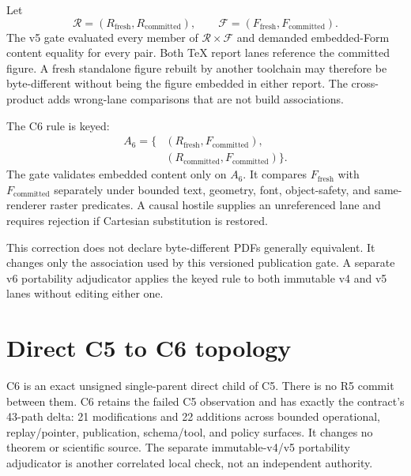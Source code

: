 \documentclass[11pt,a4paper]{article}
\begin{document}
Let
\begin{equation}
  \mathcal R=(R_{\mathrm{fresh}},R_{\mathrm{committed}}),\qquad
  \mathcal F=(F_{\mathrm{fresh}},F_{\mathrm{committed}}).
  \label{eq:lanes}
\end{equation}
The v5 gate evaluated every member of \(
\mathcal R\times\mathcal F\) and demanded embedded-Form content equality for every pair. Both TeX
report lanes reference the committed figure. A fresh standalone figure rebuilt by another
toolchain may therefore be byte-different without being the figure embedded in either report.
The cross-product adds wrong-lane comparisons that are not build associations.

The C6 rule is keyed:
\begin{equation}
  \begin{aligned}
  A_6=\{&(R_{\mathrm{fresh}},F_{\mathrm{committed}}),\\
         &(R_{\mathrm{committed}},F_{\mathrm{committed}})\}.
  \end{aligned}
  \label{eq:association}
\end{equation}
The gate validates embedded content only on $A_6$. It compares
$F_{\mathrm{fresh}}$ with $F_{\mathrm{committed}}$ separately under bounded text, geometry,
font, object-safety, and same-renderer raster predicates. A causal hostile supplies an unreferenced
lane and requires rejection if Cartesian substitution is restored.

This correction does not declare byte-different PDFs generally equivalent. It changes only the
association used by this versioned publication gate. A separate v6 portability adjudicator applies
the keyed rule to both immutable v4 and v5 lanes without editing either one.

\clearpage
\section{Direct C5 to C6 topology}

C6 is an exact unsigned single-parent direct child of C5. There is no R5 commit between them. C6
retains the failed C5 observation and has exactly the contract's 43-path delta: 21 modifications
and 22 additions across bounded operational, replay/pointer, publication, schema/tool, and policy
surfaces. It changes no theorem or scientific source. The separate immutable-v4/v5 portability
adjudicator is another correlated local check, not an independent authority.
\end{document}
